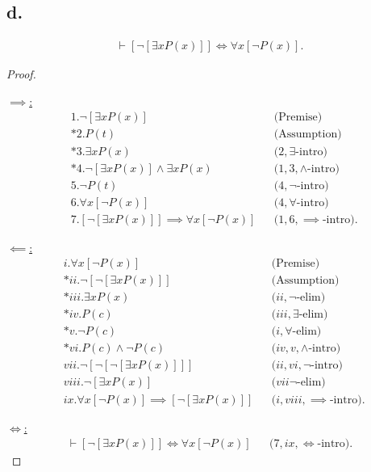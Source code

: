 \documentclass{article}
\begin{document}
\subsection*{d.}
\begin{align*}
  \vdash
  \left[ \lnot \left[ \exists x P(x) \right] \right]
  \iff
  \forall x \left[ \lnot P(x) \right].
\end{align*}
\begin{proof}
  $ $

  \underline{$\implies$:}
  \begin{align*}
    &1. \lnot \left[ \exists x P(x) \right] &&\text{(Premise)} \\
    &*2. P(t) &&\text{(Assumption)} \\
    &*3. \exists x P(x) &&\text{($2, \exists$-intro)} \\
    &*4. \lnot \left[ \exists x P(x) \right] \land \exists x P(x) &&\text{($1, 3, \land$-intro)} \\
    &5. \lnot P(t) &&\text{($4, \lnot$-intro)} \\
    &6. \forall x \left[ \lnot P(x) \right] &&\text{($4, \forall$-intro)} \\
    &7. \left[ \lnot \left[ \exists x P(x) \right] \right]
    \implies
    \forall x \left[ \lnot P(x) \right] &&\text{($1, 6, \implies$-intro)}.
  \end{align*}

  \underline{$\impliedby$:}
  \begin{align*}
    &i. \forall x \left[ \lnot P(x) \right] &&\text{(Premise)} \\
    &*ii. \lnot \left[ \lnot \left[ \exists x P(x) \right] \right] &&\text{(Assumption)} \\
    &*iii. \exists x P(x) &&\text{($ii, \lnot$-elim)} \\
    &*iv. P(c) &&\text{($iii, \exists$-elim)} \\
    &*v. \lnot P(c) &&\text{($i, \forall$-elim)} \\
    &*vi. P(c) \land \lnot P(c) &&\text{($iv, v, \land$-intro)} \\
    &vii. \lnot \left[ \lnot \left[ \lnot \left[ \exists x P(x) \right] \right] \right] &&\text{($ii, vi, \lnot$-intro)} \\
    &viii. \lnot \left[ \exists x P(x) \right]  &&\text{($vii \lnot$-elim)} \\
    &ix. \forall x \left[ \lnot P(x) \right]
    \implies
    \left[ \lnot \left[ \exists x P(x) \right] \right]
    &&\text{($i, viii, \implies$-intro)}.
  \end{align*}

  \underline{$\iff$:}
  \begin{align*}
    \vdash
    \left[ \lnot \left[ \exists x P(x) \right] \right]
    \iff
    \forall x \left[ \lnot P(x) \right]
    &&\text{($7, ix, \iff$-intro)}.
  \end{align*}

\end{proof}
\end{document}
